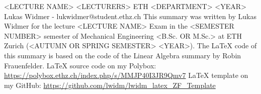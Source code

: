 \raggedbottom
\raggedright
\raggedcolumns
\begin{multicols*}{4}



	\DocumentInfo
	{<LECTURE NAME>} %
	{<LECTURERS> \newline
		ETH <DEPARTMENT> <YEAR> \newline
		Lukas Widmer - lukwidmer@student.ethz.ch} %
	{This summary was written by Lukas Widmer for the lecture <LECTURE NAME> Exam in the <SEMESTER NUMBER> semester of Mechanical Engineering <B.Sc. OR M.Sc.> at ETH Zurich (<AUTUMN OR SPRING SEMESTER> <YEAR>). \vspace{1mm}\newline
		The LaTeX code of this summary is based on the code of the Linear Algebra summary by Robin Frauenfelder. \vspace{1mm} \newline
		\LaTeX\hspace{1pt} source code on my Polybox: \newline
		\tiny \url{https://polybox.ethz.ch/index.php/s/MMJP40I3JR9Qmv7} \small \newline
		\LaTeX\hspace{1pt} template on my GitHub: \newline
		\tiny \url{https://github.com/lwidm/lwidm_latex_ZF_Template}\small
	}


	





\end{multicols*}




